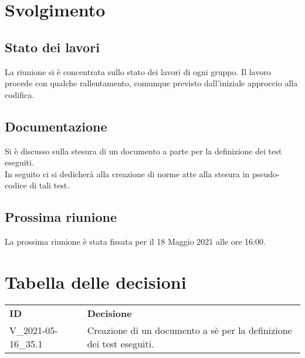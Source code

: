 \documentclass[]{article}
\begin{document}
	\newpage

	\section{Svolgimento}
		\subsection{Stato dei lavori}
		La riunione si è concentrata sullo stato dei lavori di ogni gruppo. Il lavoro procede con qualche rallentamento, comunque previsto dall'iniziale approccio alla codifica.\\

		\subsection{Documentazione}
		Si è discusso sulla stesura di un documento a parte per la definizione dei test eseguiti. \\
		In seguito ci si dedicherà alla creazione di norme atte alla stesura in pseudo-codice di tali test.\\

		\subsection{Prossima riunione}
		La prossima riunione è stata fissata per il 18 Maggio 2021 alle ore 16:00.\\




	\section{Tabella delle decisioni}

	\begin{table} [h!]
		\begin{center}
			\begin{tabular} { m{2cm} m{14cm} }
				\rowcolor{lightgray}
				\textbf{ID} & \textbf{Decisione}\\
				V\_2021-05-16\_35.1 & Creazione di un documento a sè per la definizione dei test eseguiti.
			\end{tabular}
		\end{center}
	\end{table}
\end{document}
